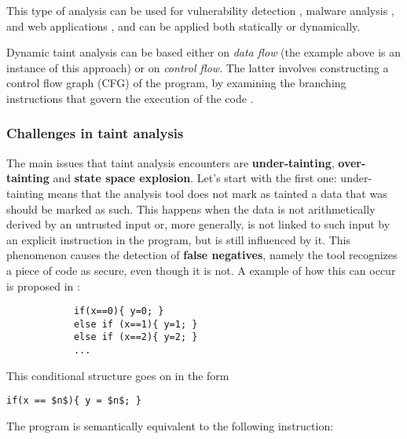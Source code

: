 \documentclass[target=mst,aauheader=aics]{thud}
\theoremstyle{definition}
\begin{document}
	This type of analysis can be used for vulnerability detection \cite{Newsome2005}, malware analysis \cite{Bayer2009} \cite{Yin2007}, and web applications \cite{Balzarotti2008} \cite{NguyenTuong2005}, and can be applied both statically or dynamically.
	
	Dynamic taint analysis can be based either on \textit{data flow} (the example above is an instance of this approach) or on \textit{control flow}. The latter involves constructing a control flow graph (CFG) of the program, by examining the branching instructions that govern the execution of the code \cite{Dai2018}.
	
	\subsubsection{Challenges in taint analysis}
	The main issues that taint analysis encounters are \textbf{under-tainting}, \textbf{over-tainting} and \textbf{state space explosion}. Let's start with the first one: under-tainting means that the analysis tool does not mark as tainted a data that was should be marked as such. This happens when the data is not arithmetically derived by an untrusted input or, more generally, is not linked to such input by an explicit instruction in the program, but is still influenced by it. This phenomenon causes the detection of \textbf{false negatives}, namely the tool recognizes a piece of code as secure, even though it is not. A example of how this can occur is proposed in \cite{Newsome2005}:
	
	\vspace{3mm}
	\begin{minipage}{.4\textwidth}
		\begin{lstlisting}
			if(x==0){ y=0; } 
			else if (x==1){ y=1; } 
			else if (x==2){ y=2; } 
			...
		\end{lstlisting}
	\end{minipage}
	
	This conditional structure goes on in the form
	
	\vspace{3mm}
	\begin{minipage}{.3\textwidth}
		\begin{lstlisting}[mathescape=true]
			if(x == $n$){ y = $n$; }
		\end{lstlisting}
	\end{minipage}
	
	The program is semantically equivalent to the following instruction:
	
\end{document}

